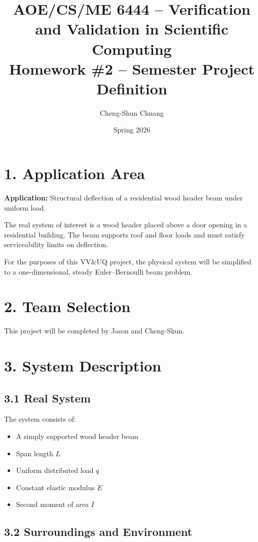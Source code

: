\documentclass[12pt]{article}
\title{AOE/CS/ME 6444 -- Verification and Validation in Scientific Computing \\
Homework \#2 -- Semester Project Definition}
\author{Cheng-Shun Chuang}
\date{Spring 2026}
\begin{document}
\maketitle

\section*{1. Application Area}

\textbf{Application:} Structural deflection of a residential wood header beam under uniform load.

The real system of interest is a wood header placed above a door opening in a residential building. The beam supports roof and floor loads and must satisfy serviceability limits on deflection.

For the purposes of this VV\&UQ project, the physical system will be simplified to a one-dimensional, steady Euler--Bernoulli beam problem.

\section*{2. Team Selection}

This project will be completed by Jason and Cheng-Shun.

\section*{3. System Description}

\subsection*{3.1 Real System}

The system consists of:

\begin{itemize}
\item A simply supported wood header beam
\item Span length $L$
\item Uniform distributed load $q$
\item Constant elastic modulus $E$
\item Second moment of area $I$
\end{itemize}

\subsection*{3.2 Surroundings and Environment}
\end{document}

